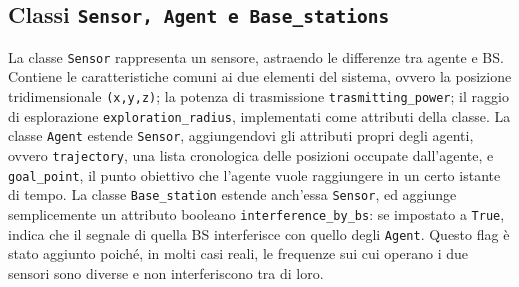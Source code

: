 \subsection{Classi \texttt{Sensor, Agent e Base\_stations}} \label{subsec:sensors}
La classe \texttt{Sensor} rappresenta un sensore, astraendo le differenze tra agente e BS.
Contiene le caratteristiche comuni ai due elementi del sistema, ovvero la posizione tridimensionale \texttt{(x,y,z)}; la potenza di trasmissione \texttt{trasmitting\_power}; il raggio di esplorazione \texttt{exploration\_radius}, implementati come attributi della classe.
La classe \texttt{Agent} estende \texttt{Sensor}, aggiungendovi gli attributi propri degli agenti, ovvero \texttt{trajectory}, una lista cronologica delle posizioni occupate dall'agente, e \texttt{goal\_point}, il punto obiettivo che l'agente vuole raggiungere in un certo istante di tempo.
La classe \texttt{Base\_station} estende anch'essa \texttt{Sensor}, ed aggiunge semplicemente un attributo booleano \texttt{interference\_by\_bs}: se impostato a \texttt{True}, indica che il segnale di quella BS interferisce con quello degli \texttt{Agent}. Questo flag è stato aggiunto poiché, in molti casi reali, le frequenze sui cui operano i due sensori sono diverse e non interferiscono tra di loro.